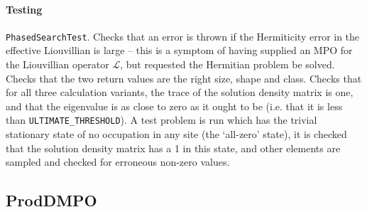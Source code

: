  \paragraph{Testing} \lstinline$PhasedSearchTest$. Checks that an error is thrown if the Hermiticity error in the effective Liouvillian is large -- this is a symptom of having supplied an MPO for the Liouvillian operator \(\mathcal{L}\), but requested the Hermitian problem be solved. Checks that the two return values are the right size, shape and class. Checks that for all three calculation variants, the trace of the solution density matrix is one, and that the eigenvalue is as close to zero as it ought to be (i.e. that it is less than \lstinline$ULTIMATE_THRESHOLD$). A test problem is run which has the trivial stationary state of no occupation in any site (the `all-zero' state), it is checked that the solution density matrix has a 1 in this state, and other elements are sampled and checked for erroneous non-zero values.
 
 \subsection{ProdDMPO}

